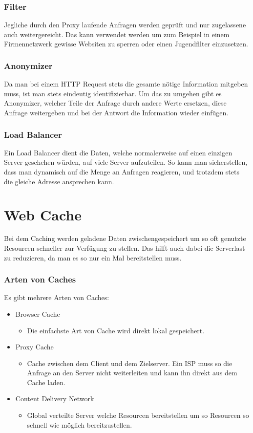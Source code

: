 \documentclass{article}
\begin{document}
	\subsubsection{Filter}
	Jegliche durch den Proxy laufende Anfragen werden geprüft und nur zugelassene auch weitergereicht. Das kann verwendet werden um zum Beispiel in einem Firmennetzwerk gewisse Websiten zu sperren oder einen Jugendfilter einzusetzen.
	\subsubsection{Anonymizer}
	Da man bei einem HTTP Request stets die gesamte nötige Information mitgeben muss, ist man stets eindeutig identifizierbar. Um das zu umgehen gibt es Anonymizer, welcher Teile der Anfrage durch andere Werte ersetzen, diese Anfrage weitergeben und bei der Antwort die Information wieder einfügen.
	\subsubsection{Load Balancer}
	Ein Load Balancer dient die Daten, welche normalerweise auf einen einzigen Server geschehen würden, auf viele Server aufzuteilen. So kann man sicherstellen, dass man dynamisch auf die Menge an Anfragen reagieren, und trotzdem stets die gleiche Adresse ansprechen kann.
	\section{Web Cache}
	Bei dem Caching werden geladene Daten zwischengespeichert um so oft genutzte Resourcen schneller zur Verfügung zu stellen. Das hilft auch dabei die Serverlast zu reduzieren, da man es so nur ein Mal bereitstellen muss.
	\subsubsection{Arten von Caches}
	Es gibt mehrere Arten von Caches:
	\begin{itemize}
		\item{Browser Cache}
		\begin{itemize}
			\item{Die einfachste Art von Cache wird direkt lokal gespeichert.}
		\end{itemize}
		\item{Proxy Cache}
		\begin{itemize}
			\item{Cache zwischen dem Client und dem Zielserver. Ein ISP muss so die Anfrage an den Server nicht weiterleiten und kann ihn direkt aus dem Cache laden.}
		\end{itemize}
		\item{Content Delivery Network}
		\begin{itemize}
			\item{Global verteilte Server welche Resourcen bereitstellen um so Resourcen so schnell wie möglich bereitzustellen.}
		\end{itemize}
	\end{itemize}
\end{document}
